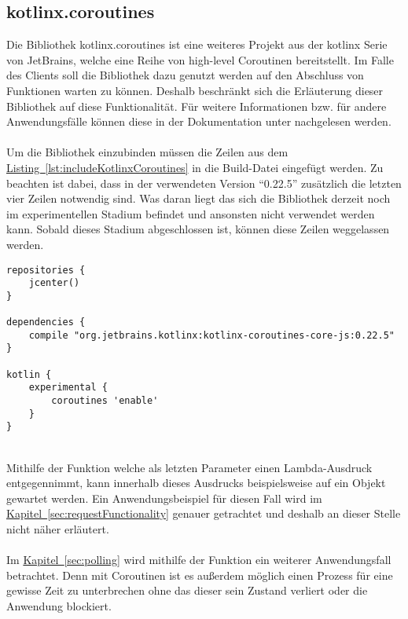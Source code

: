 \subsection{kotlinx.coroutines}\label{sec:kotlinxCoroutines}
Die Bibliothek kotlinx.coroutines \cite{kotlinxCoroutines} ist eine weiteres Projekt aus der kotlinx Serie von JetBrains, welche eine Reihe von high-level Coroutinen bereitstellt. Im Falle des Clients soll die Bibliothek dazu genutzt werden auf den Abschluss von Funktionen warten zu können. Deshalb beschränkt sich die Erläuterung dieser Bibliothek auf diese Funktionalität. Für weitere Informationen bzw. für andere Anwendungsfälle können diese in der Dokumentation unter \cite{kotlinxCoroutinesDocu} nachgelesen werden.\\
\\
Um die Bibliothek einzubinden müssen die Zeilen aus dem \hyperref[lst:includeKotlinxCoroutines]{Listing~\ref{lst:includeKotlinxCoroutines}} in die Build-Datei eingefügt werden. Zu beachten ist dabei, dass in der verwendeten Version \enquote{0.22.5} zusätzlich die letzten vier Zeilen notwendig sind. Was daran liegt das sich die Bibliothek derzeit noch im experimentellen Stadium befindet und ansonsten nicht verwendet werden kann. Sobald dieses Stadium abgeschlossen ist, können diese Zeilen weggelassen werden.
\\
\begin{lstlisting}[style=lstStyleFramed, language=Gradle, caption={Einbindung der Bibliothek kotlinx.coroutines mittels Gradle}, label=lst:includeKotlinxCoroutines, float]
repositories {
	jcenter()
}

dependencies {
	compile "org.jetbrains.kotlinx:kotlinx-coroutines-core-js:0.22.5"
}

kotlin {
	experimental {
		coroutines 'enable'
	}
}
\end{lstlisting}
\\
Mithilfe der Funktion  welche als letzten Parameter einen Lambda-Ausdruck entgegennimmt, kann innerhalb dieses Ausdrucks beispielsweise auf ein  Objekt gewartet werden. Ein Anwendungsbeispiel für diesen Fall wird im \hyperref[sec:requestFunctionality]{Kapitel~\ref{sec:requestFunctionality}} genauer getrachtet und deshalb an dieser Stelle nicht näher erläutert.\\
\\
Im \hyperref[sec:polling]{Kapitel~\ref{sec:polling}} wird mithilfe der Funktion  ein weiterer Anwendungsfall betrachtet. Denn mit Coroutinen ist es außerdem möglich einen Prozess für eine gewisse Zeit zu unterbrechen ohne das dieser sein Zustand verliert oder die Anwendung blockiert.

